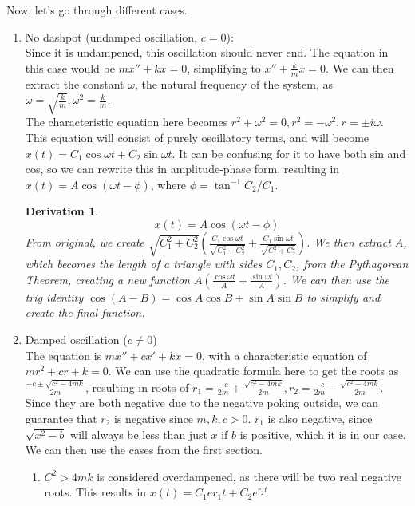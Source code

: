 \documentclass{article}
\newtheorem{derivation}{Derivation}
\begin{document}
Now, let's go through different cases.
\begin{enumerate}[Opt. a: ]
	\item No dashpot (undamped oscillation, $c=0$):
		\\Since it is undampened, this oscillation should never end. 
		The equation in this case would be $mx''+kx=0$, simplifying to $x''+\frac{k}{m}x=0$. 
		We can then extract the constant $\omega$, the natural frequency of the system, as $\omega=\sqrt{\frac{k}{m}}, \omega^2=\frac{k}{m}$.
		\\The characteristic equation here becomes 
		$r^2+\omega^2=0, r^2=-\omega^2, r=\pm i\omega$.
		This equation will consist of purely oscillatory terms, and will become 
		$x(t)=C_1 \cos{\omega t}+C_2 \sin{\omega t}$.
		It can be confusing for it to have both sin and cos, so we can rewrite this in amplitude-phase form, resulting in $x(t)=A \cos{(\omega t-\phi)}$, where $\phi=\tan^{-1}{C_2/C_1}$.
	\begin{derivation}
		\begin{equation} x(t)=A \cos{(\omega t-\phi)} \end{equation}
		From original, we create $\sqrt{C_1^2+C_2^2}(\frac{C_1 \cos{\omega t}}{\sqrt{C_1^2+C_2^2}}+\frac{C_1 \sin{\omega t}}{\sqrt{C_1^2+C_2^2}})$. 
		We then extract $A$, which becomes the length of a triangle with sides $C_1,C_2$, from the Pythagorean Theorem, creating a new function $A(\frac{\cos {\omega t}}{A} + \frac{\sin {\omega t}}{A})$. We can then use the trig identity $\cos{(A-B)}=\cos{A}\cos{B}+\sin{A}\sin{B}$ to simplify and create the final function.
	\end{derivation}
	\item Damped oscillation ($c \neq 0$)
		\\The equation is $mx''+cx'+kx=0$, with a characteristic equation of $mr^2+cr+k=0$. 
		We can use the quadratic formula here to get the roots as $\frac{-c \pm \sqrt{c^2-4mk}}{2m}$,
		resulting in roots of $r_1=\frac{-c}{2m}+\frac{\sqrt{c^2-4mk}}{2m}, r_2=\frac{-c}{2m}-\frac{\sqrt{c^2-4mk}}{2m}$. 
				Since they are both negative due to the negative poking outside, we can guarantee that $r_2$ is negative since $m,k,c>0$.
				$r_1$ is also negative, since $\sqrt{x^2-b}$ will always be less than just $x$ if $b$ is positive, which it is in our case. We can then use the cases from the first section.
		\begin{enumerate}
			\item $C^2>4mk$ is considered overdampened, as there will be two real negative roots. This results in $x(t)=C_1e{r_1t}+C_2e^{r_2t}$

\end{enumerate}
\end{enumerate}
\end{document}
